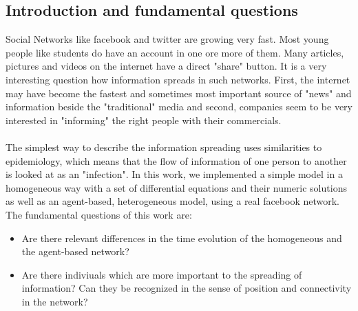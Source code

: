 \subsection{Introduction and fundamental questions}

Social Networks like facebook and twitter are growing very fast. Most young people like students do have an account in one ore more of them. Many articles, pictures and videos on the internet have a direct "share" button. It is a very interesting question how information spreads in such networks. First, the internet may have become the fastest and sometimes most important source of "news" and information beside the "traditional" media and second, companies seem to be very interested in "informing" the right people with their commercials. 
\\
\\
The simplest way to describe the information spreading uses similarities to epidemiology, which means that the flow of information of one person to another is looked at as an "infection". In this work, we implemented a simple model in a homogeneous way with a set of differential equations and their numeric solutions as well as an agent-based, heterogeneous model, using a real facebook network.
\\
The fundamental questions of this work are:

\begin{itemize}
\item Are there relevant differences in the time evolution of the homogeneous and the agent-based network?

\item Are there indiviuals which are more important to the spreading of information? Can they be recognized in the sense of position and connectivity in the network?
\end{itemize}














